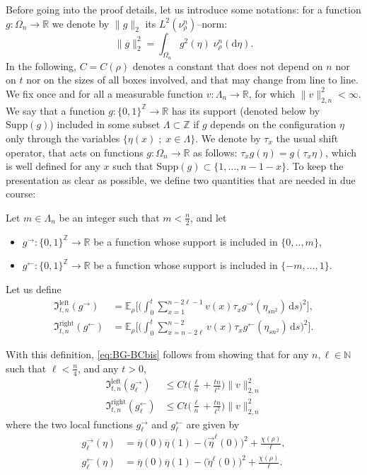 \documentclass[AHL,Unicode,longabstracts]{cedram}
\newcommand{\bb}[1]{{\mathbb #1}}
\renewcommand\vec[1]{\overrightarrow{#1}}
\newcommand\vecleft[1]{\overleftarrow{#1}}
\renewcommand{\bar}{\overline}
\renewcommand{\leq}{\leqslant}
\newcommand*{\dd}{\mathrm{d}}
\newcommand*{\ds}{\dd s}
\begin{document}
Before going into the proof details, let us introduce some notations: for a function $g:\Omega_n\to\bb R$ we denote by $\|g\|_2$ its $ L^2(\nu^n_\rho)$--norm:
\[
\|g\|_2^2=\int_{\Omega_n} g^2(\eta) \; \nu^n_\rho(\dd\eta).
\]
In the following, $C=C(\rho)$ denotes a constant that does not depend on $n$ nor on $t$ nor on the sizes of all boxes involved, and that may change from line to line. We fix once and for all a measurable function $v:\Lambda_n\to\bb R$, for which $\|v\|_{2,n}^2<\infty$. We say that a function $g:\{0,1 \}^{\bb Z} \to \bb R$ has its support (denoted below by $ \mathrm{Supp}(g)$) included in some subset $\Lambda \subset \bb Z$ if $g$ depends on the configuration $\eta$ only through the variables $\{\eta(x) \; ; \; x \in \Lambda\}$. We denote by $\tau_x$ the usual shift operator, that acts on functions $g:\Omega_n\to\bb R$ as follows: $\tau_xg(\eta)=g(\tau_x\eta)$, which is well defined for any $x$ such that $\mathrm{Supp}(g) \subset \{1,\dots,n-1-x\}$. To keep the presentation as clear as possible, we define two quantities that are needed in due course:

\begin{defi}
Let $m\in\Lambda_n$ be an integer such that $m <\frac n 2$, and let
\begin{itemize}
\item $g^\rightarrow:\{0,1\}^{\bb Z}\to\bb R$ be a function whose support is included in $\{0,..,m\}$,
\item $g^\leftarrow:\{0,1\}^{\bb Z}\to\bb R$ be a function whose support is included in $\{-m,\dots,1\}$.
\end{itemize}
Let us define
\begin{align*}
\mathfrak{I}^{\mathrm{left}}_{t,n}(g^\rightarrow)&=\bb E_\rho\bigg[\bigg(\int_0^t \sum_{x=1}^{n-2\ell-1} v(x) \tau_xg^\rightarrow(\eta_{sn^2}) \,\ds\bigg)^2\bigg],\\
\mathfrak{I}^{\mathrm{right}}_{t,n}(g^\leftarrow)&=\bb E_\rho\bigg[\bigg(\int_0^t \sum_{x=n-2\ell}^{n-2} v(x) \tau_xg^\leftarrow(\eta_{sn^2}) \,\ds\bigg)^2\bigg].
\end{align*}
\end{defi}

With this definition, \eqref{eq:BG-BCbis} follows from showing that for any $n,\ell \in \bb N$ such that $\ell <\frac n 4$, and any $t>0$,
\begin{align}
\mathfrak{I}^{\mathrm{left}}_{t,n}(g_\ell^\rightarrow)&\leq Ct\bigg(\frac{\ell}{n}+\frac{tn}{\ell^2}\bigg) \|v\|_{2,n}^2 \label{eq:Ileft}
\\
\mathfrak{I}^{\mathrm{right}}_{t,n}(g_\ell^\leftarrow)& \leq Ct\bigg(\frac{\ell}{n}+\frac{tn}{\ell^2}\bigg)\|v\|_{2,n}^2 \label{eq:Iright}
\end{align}
where the two local functions $g_\ell^\rightarrow$ and $g_\ell^\leftarrow$ are given by
\begin{align}
g_\ell^\rightarrow(\eta)&=\bar\eta(0)\bar\eta(1) - \big(\vec\eta^\ell(0)\big)^2 + \frac{\chi(\rho)}{\ell}, \label{eq:psileft}
\\
g_\ell^\leftarrow(\eta)&=\bar\eta(0)\bar\eta(1) - \big(\vecleft\eta^\ell(0)\big)^2 + \frac{\chi(\rho)}{\ell}. \label{eq:psiright}
\end{align}
\end{document}
